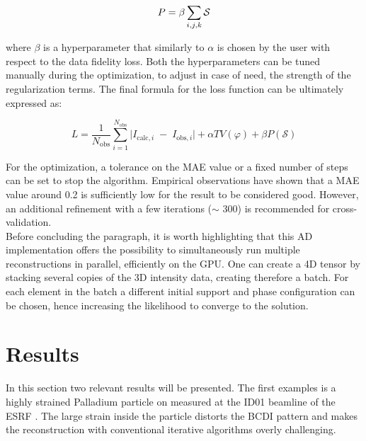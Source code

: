 \begin{equation}
    \centering
    P = \beta  \sum_{i,j,k} \mathcal S
\end{equation}

where $\beta$ is a hyperparameter that similarly to $\alpha$ is chosen by the user with respect to the data fidelity loss. 
Both the hyperparameters can be tuned manually during the optimization, to adjust in case of need, the strength of 
the regularization terms. 
The final formula for the loss function can be ultimately expressed as: 

\begin{equation}
       L = \frac{1}{N_{\mathrm{obs}}}
       \sum_{i=1}^{N_{\mathrm{obs}}}
       \bigl\lvert I_{\mathrm{calc},i} \;-\; I_{\mathrm{obs},i}\bigr\rvert  
        + \alpha TV(\varphi)
        + \beta  P(\mathcal S)
\end{equation}

For the optimization, a tolerance on the MAE value or a fixed number of steps can be set to stop the algorithm. Empirical 
observations have shown that a MAE value around 0.2 is sufficiently low for the result to be considered good. However, 
an additional refinement with a few iterations ($\sim$ 300) is recommended for cross-validation.  \\

Before concluding the paragraph, it is worth highlighting that this AD implementation offers the possibility to simultaneously 
run multiple reconstructions in parallel, efficiently on the GPU. One can create a 4D tensor by stacking several copies of the 3D 
intensity data, creating therefore a batch. For each element in the batch a different initial support and phase configuration 
can be chosen, hence increasing the likelihood to converge to the solution. 

\section{Results}
In this section two relevant results will be presented. The first examples is a highly strained Palladium particle on 
measured at the ID01 beamline of the ESRF \cite{bellec2026ultrafast}. 
The large strain inside the particle distorts the BCDI pattern and makes the reconstruction with conventional iterative 
algorithms overly challenging. 

